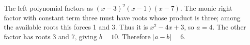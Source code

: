 The left polynomial factors as $(x-3)^2(x-1)(x-7)$. The monic right factor with constant term three must have roots whose product is three; among the available roots this forces 1 and 3. Thus it is $x^2-4x+3$, so $a=4$. The other factor has roots 3 and 7, giving $b=10$. Therefore $|a-b|=\boxed6$.
